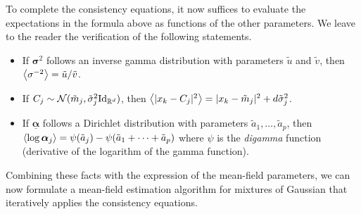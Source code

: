To complete the consistency equations, it now suffices to evaluate the expectations in the formula above as functions of the other parameters. We leave to  the reader the verification of the following statements.
\begin{itemize}
\item If $\boldsymbol\sigma^2$ follows an inverse gamma distribution with parameters $\tilde{u}$ and $\tilde{v}$, then  $\left\langle\sigma^{-2}\right\rangle = \tilde{u}/\tilde{v}$.
\item If $C_j \sim \CN(\tilde m_j, \tilde{\sigma}^2_j \Id[d])$, then $\left\langle|x_k-C_j|^2\right\rangle = |x_k-\tilde m_j|^2 + d\tilde{\sigma}^2_j$. 
\item  If $\underline{\boldsymbol\alpha}$ follows a Dirichlet distribution with parameters $\tilde a_1, \ldots, \tilde a_p$, then $\left\langle\log\bm\alpha_j\right\rangle = \psi(\tilde a_j) - \psi(\tilde a_1+\cdots + \tilde a_p)$ where $\psi$ is the {\em digamma} function (derivative of the logarithm of the gamma function).
\end{itemize}

Combining these facts with the expression of the mean-field parameters, we can now formulate a mean-field estimation algorithm for mixtures of Gaussian that iteratively applies the consistency equations.

